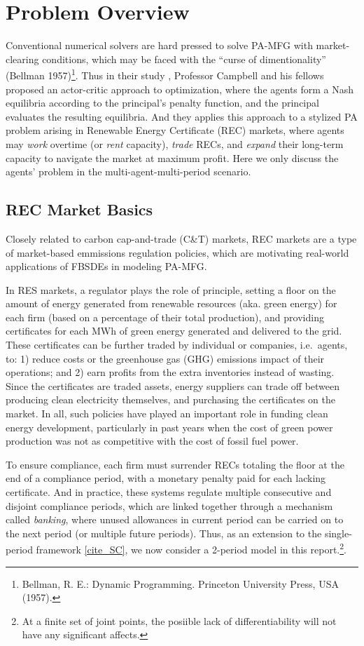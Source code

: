 \documentclass[a4paper,10pt]{article}
\newcommand{\1}{\mathbf{1}}
\begin{document}
\section{Problem Overview}

Conventional numerical solvers are hard pressed to solve PA-MFG with
market-clearing conditions, which may be faced with the ``curse of
dimentionality'' (Bellman 1957)\footnote{Bellman, R. E.: Dynamic
  Programming. Princeton University Press, USA (1957).}. Thus in their
study \cite{SC},
Professor Campbell and his fellows proposed an actor-critic approach to
optimization, where the agents form a Nash equilibria according to the
principal's penalty function, and the principal evaluates the resulting
equilibria. And they applies this approach to a stylized PA problem
arising in Renewable Energy Certificate (REC) markets, where agents may
\emph{work} overtime (or \emph{rent} capacity), \emph{trade} RECs, and
\emph{expand} their long-term capacity to navigate the market at maximum
profit. Here we only discuss the agents' problem in the
multi-agent-multi-period scenario.

\subsection{REC Market Basics}

Closely related to carbon cap-and-trade (C\&T) markets, REC markets are
a type of market-based emmissions regulation policies, which are
motivating real-world applications of FBSDEs in modeling PA-MFG.

In RES markets, a regulator plays the role of principle, setting a floor
on the amount of energy generated from renewable resources (aka. green
energy) for each firm (based on a percentage of their total production),
and providing certificates for each MWh of green energy generated and
delivered to the grid. These certificates can be further traded by
individual or companies, i.e.~agents, to: 1) reduce costs or the
greenhouse gas (GHG) emissions impact of their operations; and 2) earn
profits from the extra inventories instead of wasting. Since the
certificates are traded assets, energy suppliers can trade off between
producing clean electricity themselves, and purchasing the certificates
on the market. In all, such policies have played an important role in
funding clean energy development, particularly in past years when the
cost of green power production was not as competitive with the cost of
fossil fuel power.

To ensure compliance, each firm must surrender RECs totaling the floor
at the end of a compliance period, with a monetary penalty paid for each
lacking certificate. And in practice, these systems regulate multiple
consecutive and disjoint compliance periods, which are linked together
through a mechanism called \emph{banking}, where unused allowances in
current period can be carried on to the next period (or multiple future
periods). Thus, as an extension to the single-period framework \ref{cite_SC}, we
now consider a 2-period model in this report.\footnote{At a finite set
  of joint points, the posiible lack of differentiability will not have
  any significant affects.}.
\end{document}
